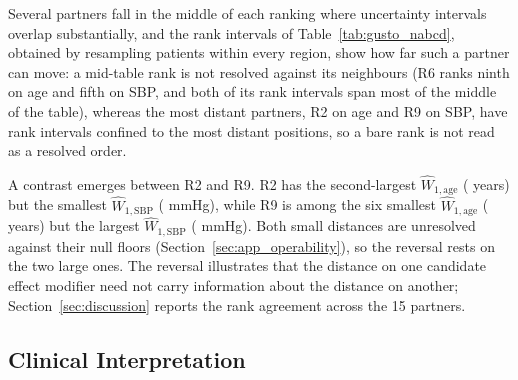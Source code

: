 \documentclass[AMA,Times1COL]{WileyNJDv5}
\begin{document}
Several partners fall in the middle of each ranking where uncertainty intervals overlap substantially, and the rank intervals of Table~\ref{tab:gusto_nabcd}, obtained by resampling patients within every region, show how far such a partner can move: a mid-table rank is not resolved against its neighbours (R6 ranks ninth on age and fifth on SBP, and both of its rank intervals span most of the middle of the table), whereas the most distant partners, R2 on age and R9 on SBP, have rank intervals confined to the most distant positions, so a bare rank is not read as a resolved order.

A contrast emerges between R2 and R9. R2 has the second-largest $\widehat{W}_{1,\text{age}}$ ( years) but the smallest $\widehat{W}_{1,\text{SBP}}$ ( mmHg), while R9 is among the six smallest $\widehat{W}_{1,\text{age}}$ ( years) but the largest $\widehat{W}_{1,\text{SBP}}$ ( mmHg). Both small distances are unresolved against their null floors (Section~\ref{sec:app_operability}), so the reversal rests on the two large ones. The reversal illustrates that the distance on one candidate effect modifier need not carry information about the distance on another; Section~\ref{sec:discussion} reports the rank agreement across the 15 partners.

\subsection{Clinical Interpretation}\label{sec:app_clinical}

\end{document}
